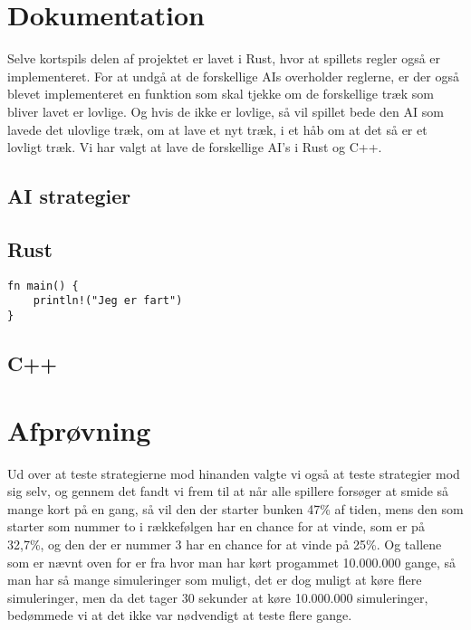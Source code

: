 \documentclass[a4paper, 12pt]{article}
\begin{document}
\section{Dokumentation}

Selve kortspils delen af projektet er lavet i Rust, hvor at spillets regler også er implementeret. For at undgå at de forskellige AIs overholder reglerne, er der også blevet implementeret en funktion som skal tjekke om de forskellige træk som bliver lavet er lovlige. Og hvis de ikke er lovlige, så vil spillet bede den AI som lavede det ulovlige træk, om at lave et nyt træk, i et håb om at det så er et lovligt træk. Vi har valgt at lave de forskellige AI's i Rust og C++.

\subsection{AI strategier}







\vfill
\pagebreak


\subsection{Rust}


\begin{verbatim}
fn main() {
	println!("Jeg er fart")
}
\end{verbatim}


\subsection{C++}



\vfill
\pagebreak

\section{Afprøvning}











Ud over at teste strategierne mod hinanden valgte vi også at teste strategier mod sig selv, og gennem det fandt vi frem til at når alle spillere forsøger at smide så mange kort på en gang, så vil den der starter bunken 47\% af tiden, mens den som starter som nummer to i rækkefølgen har en chance for at vinde, som er på 32,7\%, og den der er nummer 3 har en chance for at vinde på 25\%. 
Og tallene som er nævnt oven for er fra hvor man har kørt progammet 10.000.000 gange, så man har så mange simuleringer som muligt, det er dog muligt at køre flere simuleringer, men da det tager 30 sekunder at køre 10.000.000 simuleringer, bedømmede vi at det ikke var nødvendigt at teste flere gange.
\end{document}
